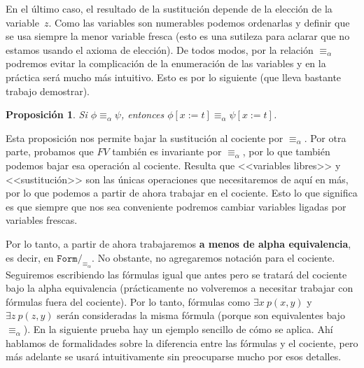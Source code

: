 \documentclass[a4paper, 12pt]{report}
\newtheorem{prop}[teorema]{Proposición}
\theoremstyle{definition}
\begin{document}
En el último caso, el resultado de la sustitución depende de la elección de la variable~$z$. Como las variables son numerables podemos ordenarlas y definir que se usa siempre la menor variable fresca (esto es una sutileza para aclarar que no estamos usando el axioma de elección). De todos modos, por la relación $\equiv_\alpha$ podremos evitar la complicación de la enumeración de las variables y en la práctica será mucho más intuitivo. Esto es por lo siguiente (que lleva bastante trabajo demostrar).
\begin{prop}
	Si $\phi\equiv_\alpha\psi$, entonces $\phi[x:=t]\equiv_\alpha\psi[x:=t]$.
\end{prop}
Esta proposición nos permite bajar la sustitución al cociente por $\equiv_\alpha$. Por otra parte, probamos que $FV$ también es invariante por $\equiv_\alpha$, por lo que también podemos bajar esa operación al cociente. Resulta que <<variables libres>> y <<sustitución>> son las únicas operaciones que necesitaremos de aquí en más, por lo que podemos a partir de ahora trabajar en el cociente. Esto lo que significa es que siempre que nos sea conveniente podremos cambiar variables ligadas por variables frescas.

Por lo tanto, a partir de ahora trabajaremos \textbf{a menos de alpha equivalencia}, es decir, en $\mathtt{Form}/_{\equiv_\alpha}$. No obstante, no agregaremos notación para el cociente. Seguiremos escribiendo las fórmulas igual que antes pero se tratará del cociente bajo la alpha equivalencia (prácticamente no volveremos a necesitar trabajar con fórmulas fuera del cociente). Por lo tanto, fórmulas como $\exists x ~p(x,y)$ y $\exists z~p(z,y)$ serán consideradas la misma fórmula (porque son equivalentes bajo $\equiv_\alpha$). En la siguiente prueba hay un ejemplo sencillo de cómo se aplica. Ahí hablamos de formalidades sobre la diferencia entre las fórmulas y el cociente, pero más adelante se usará intuitivamente sin preocuparse mucho por esos detalles.
\end{document}

